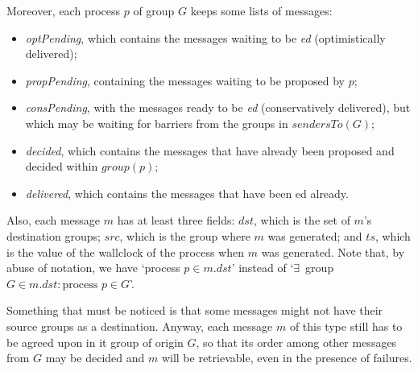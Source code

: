 \documentclass[times, 10pt]{article}
\begin{document}
Moreover, each process $p$ of group $G$ keeps some lists of messages:
\begin{itemize}
  \item \textit{optPending}, which contains the messages waiting to be \mbox{\textit{\opt{}ed}} (optimistically delivered);
  \item \textit{propPending}, containing the messages waiting to be proposed by $p$;
  \item \textit{consPending}, with the messages ready to be \textit{\cons{}ed} (conservatively delivered), but which may be waiting for barriers from the groups in $sendersTo(G)$;
  \item \textit{decided}, which contains the messages that have already been proposed and decided within $group(p)$;
  \item \textit{delivered}, which contains the messages that have been \cons{}ed already.
\end{itemize} 

Also, each message $m$ has at least three fields: $dst$, which is the set of $m$'s destination groups; $src$, which is the group where $m$ was generated; and $ts$, which is the value of the wallclock of the process when $m$ was generated. %
Note that, by abuse of notation, we have `process \mbox{$p \in m.dst$'} instead of `\mbox{$\exists$ group $G \in m.dst : \text{process }p \in G$'}.

Something that must be noticed is that some messages might not have their source groups as a destination. Anyway, each message $m$ of this type still has to be agreed upon in it group of origin $G$, so that its order among other messages from $G$ may be decided and %
$m$ will be retrievable, even in the presence of failures.%
\end{document}
